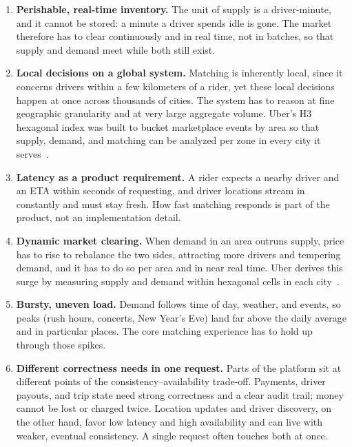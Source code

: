 \begin{enumerate}[leftmargin=1.6em,itemsep=0.2em]
  \item \textbf{Perishable, real-time inventory.} The unit of supply is a
        driver-minute, and it cannot be stored: a minute a driver spends idle
        is gone. The market therefore has to clear continuously and in real
        time, not in batches, so that supply and demand meet while both still
        exist.

  \item \textbf{Local decisions on a global system.} Matching is inherently
        local, since it concerns drivers within a few kilometers of a rider,
        yet these local decisions happen at once across thousands of cities.
        The system has to reason at fine geographic granularity and at very
        large aggregate volume. Uber's H3 hexagonal index was built to bucket
        marketplace events by area so that supply, demand, and matching can be
        analyzed per zone in every city it serves~\cite{uberH3}.

  \item \textbf{Latency as a product requirement.} A rider expects a nearby
        driver and an ETA within seconds of requesting, and driver locations
        stream in constantly and must stay fresh. How fast matching responds
        is part of the product, not an implementation detail.

  \item \textbf{Dynamic market clearing.} When demand in an area outruns
        supply, price has to rise to rebalance the two sides, attracting more
        drivers and tempering demand, and it has to do so per area and in
        near real time. Uber derives this surge by measuring supply and
        demand within hexagonal cells in each city~\cite{uberH3}.

  \item \textbf{Bursty, uneven load.} Demand follows time of day, weather,
        and events, so peaks (rush hours, concerts, New Year's Eve) land far
        above the daily average and in particular places. The core matching
        experience has to hold up through those spikes.

  \item \textbf{Different correctness needs in one request.} Parts of the
        platform sit at different points of the consistency--availability
        trade-off. Payments, driver payouts, and trip state need strong
        correctness and a clear audit trail; money cannot be lost or charged
        twice. Location updates and driver discovery, on the other hand,
        favor low latency and high availability and can live with weaker,
        eventual consistency. A single request often touches both at once.


\end{enumerate}
